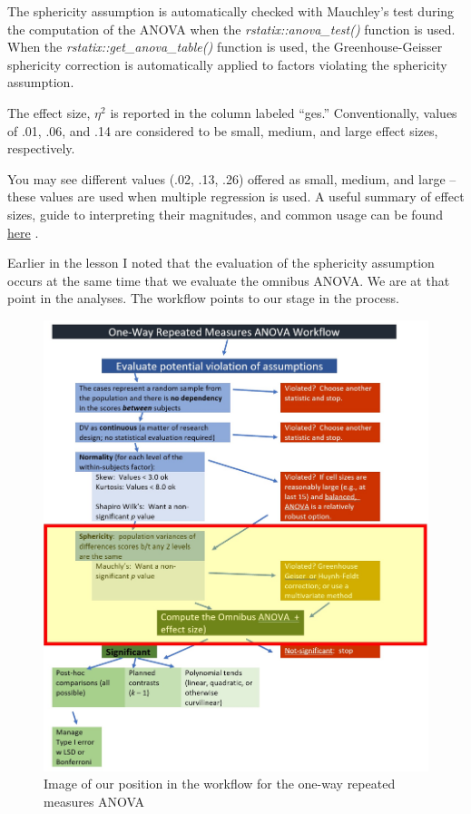 \documentclass[
  11pt,
]{book}
\begin{document}
The sphericity assumption is automatically checked with Mauchley's test during the computation of the ANOVA when the \emph{rstatix::anova\_test()} function is used. When the \emph{rstatix::get\_anova\_table()} function is used, the Greenhouse-Geisser sphericity correction is automatically applied to factors violating the sphericity assumption.

The effect size, \(\eta^2\) is reported in the column labeled ``ges.'' Conventionally, values of .01, .06, and .14 are considered to be small, medium, and large effect sizes, respectively.

You may see different values (.02, .13, .26) offered as small, medium, and large -- these values are used when multiple regression is used. A useful summary of effect sizes, guide to interpreting their magnitudes, and common usage can be found \href{https://imaging.mrc-cbu.cam.ac.uk/statswiki/FAQ/effectSize}{here} \citep{watson_rules_2020}.

Earlier in the lesson I noted that the evaluation of the sphericity assumption occurs at the same time that we evaluate the omnibus ANOVA. We are at that point in the analyses. The workflow points to our stage in the process.

\begin{figure}
\centering
\includegraphics{images/oneway_repeated/wf_rptd_omnibus.jpg}
\caption{Image of our position in the workflow for the one-way repeated measures ANOVA}
\end{figure}
\end{document}
